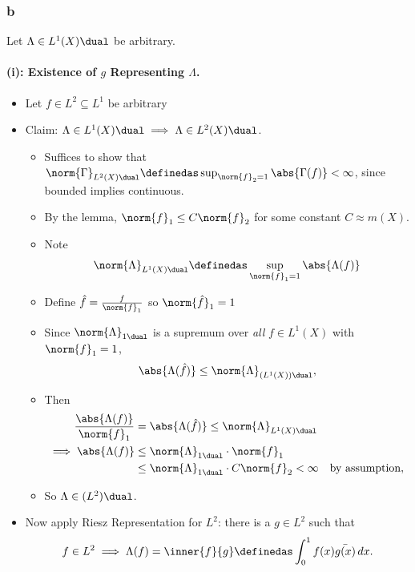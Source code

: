 \begin{solution}
\hypertarget{b-21}{%
\subsubsection{b}\label{b-21}}

Let \(\Lambda \in L^1(X)\dual\) be arbitrary.

\hypertarget{i-existence-of-g-representing-lambda.}{%
\paragraph{\texorpdfstring{(i): Existence of \(g\) Representing
\(\Lambda\).}{(i): Existence of g Representing \textbackslash Lambda.}}\label{i-existence-of-g-representing-lambda.}}

\begin{itemize}
\item
  Let \(f\in L^2\subseteq L^1\) be arbitrary
\item
  Claim: \(\Lambda\in L^1(X)\dual \implies \Lambda \in L^2(X)\dual\).

  \begin{itemize}
  \item
    Suffices to show that
    \(\norm{\Gamma}_{L^2(X)\dual} \definedas \sup_{\norm{f}_2 = 1} \abs{\Gamma(f)} < \infty\),
    since bounded implies continuous.
  \item
    By the lemma, \(\norm{f}_1 \leq C\norm{f}_2\) for some constant
    \(C \approx m(X)\).
  \item
    Note
    \begin{align*}\norm{\Lambda}_{L^1(X)\dual} \definedas \displaystyle\sup_{\norm{f}_1 = 1} \abs{\Lambda(f)}\end{align*}
  \item
    Define \(\hat f = {f\over \norm{f}_1}\) so \(\norm{\hat f}_1 = 1\)
  \item
    Since \(\norm{\Lambda}_{1\dual}\) is a supremum over \emph{all}
    \(f \in L^1(X)\) with \(\norm{f}_1 =1\),
    \begin{align*}
    \abs{\Lambda(\hat f)} \leq \norm{\Lambda}_{(L^1(X))\dual}
    ,\end{align*}
  \item
    Then
    \begin{align*}
    \frac{\abs{\Lambda(f)}}{\norm{f}_1} &= \abs{\Lambda(\hat f)} \leq \norm{\Lambda}_{L^1(X)\dual} \\
    \implies \abs{\Lambda(f)} 
    &\leq \norm{\Lambda}_{1\dual} \cdot \norm{f}_1 \\
    &\leq \norm{\Lambda}_{1\dual} \cdot C \norm{f}_2 < \infty \quad\text{by assumption}
    ,\end{align*}
  \item
    So \(\Lambda \in (L^2)\dual\).
  \end{itemize}
\item
  Now apply Riesz Representation for \(L^2\): there is a \(g \in L^2\)
  such that
  \begin{align*}f\in L^2 \implies \Lambda(f) = \inner{f}{g} \definedas \int_0^1 f(x) \bar{g(x)}\, dx.\end{align*}
\end{itemize}


\end{solution}
